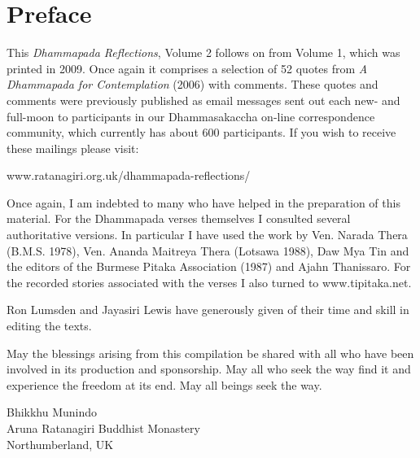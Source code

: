 
\chapter{Preface}

This \emph{Dhammapada Reflections}, Volume 2 follows on from Volume 1, which was printed in 2009. Once again it comprises a selection of 52 quotes from \emph{A Dhammapada for Contemplation} (2006) with comments. These quotes and comments were previously published as email messages sent out each new- and full-moon to participants in our Dhammasakaccha on-line correspondence community, which currently has about 600 participants. If you wish to receive these mailings please visit:

\vspace*{0.2\baselineskip}
{\centering
www.ratanagiri.org.uk/dhammapada-reflections/

}
\vspace*{0.2\baselineskip}

Once again, I am indebted to many who have helped in the preparation of this material. For the Dhammapada verses themselves I consulted several authoritative versions. In particular I have used the work by Ven. Narada Thera (B.M.S. 1978), Ven. Ananda Maitreya Thera (Lotsawa 1988), Daw Mya Tin and the editors of the Burmese Pitaka Association (1987) and Ajahn Thanissaro. For the recorded stories associated with the verses I also turned to www.tipitaka.net. 

Ron Lumsden and Jayasiri Lewis have generously given of their time and skill in editing the texts.

May the blessings arising from this compilation be shared with all who have been involved in its production and sponsorship.  May all who seek the way find it and experience the freedom at its end. May all beings seek the way.

{\par\raggedleft
Bhikkhu Munindo\\
Aruna Ratanagiri Buddhist Monastery\\
Northumberland, UK
\par}

